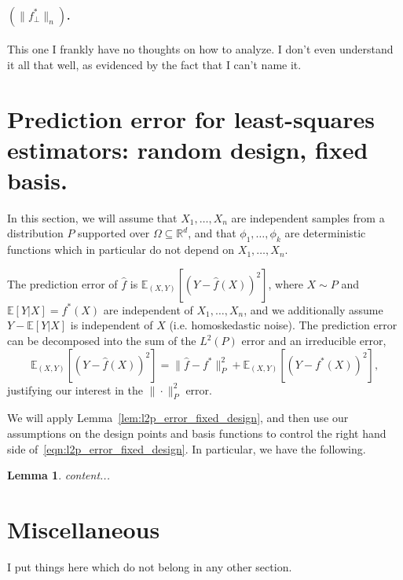 \documentclass{article}
\newcommand{\Reals}{\mathbb{R}}
\newcommand{\1}{\mathbf{1}}
\newcommand{\Rd}{\Reals^d}
\newcommand{\wh}[1]{\widehat{#1}}
\newtheorem{lemma}{Lemma}
\theoremstyle{definition}
\theoremstyle{remark}
\begin{document}
\paragraph{$(\|f_{\perp}^{\ast}\|_n)$.}

This one I frankly have no thoughts on how to analyze. I don't even understand it all that well, as evidenced by the fact that I can't name it.


\clearpage

\section{Prediction error for least-squares estimators: random design, fixed basis.}
In this section, we will assume that $X_1,\ldots,X_n$ are independent samples from a distribution $P$ supported over $\Omega \subseteq \Rd$, and that $\phi_1,\ldots,\phi_k$ are deterministic functions which in particular do not depend on $X_1,\ldots,X_n$.

The prediction error of $\wh{f}$ is $\mathbb{E}_{(X,Y)}[(Y - \wh{f}(X))^2]$, where $X \sim P$ and $\mathbb{E}[Y|X] = f^{\ast}(X)$ are independent of $X_1,\ldots,X_n$, and we additionally assume $Y - \mathbb{E}[Y|X]$ is independent of $X$ (i.e. homoskedastic noise). The prediction error can be decomposed into the sum of the $L^2(P)$ error and an irreducible error,
\begin{equation}
\mathbb{E}_{(X,Y)}[(Y - \wh{f}(X))^2] = \|\wh{f} - f^{\ast}\|_P^2 + \mathbb{E}_{(X,Y)}[(Y - f^{\ast}(X))^2],
\end{equation}
justifying our interest in the $\|\cdot\|_P^2$ error.

We will apply Lemma~\ref{lem:l2p_error_fixed_design}, and then use our assumptions on the design points and basis functions to control the right hand side of~\eqref{eqn:l2p_error_fixed_design}. In particular, we have the following. 
\begin{lemma}
	content...
\end{lemma}

\section{Miscellaneous}
I put things here which do not belong in any other section.
\end{document}
